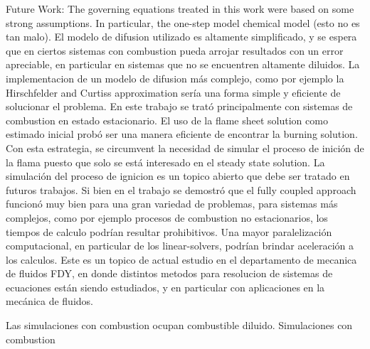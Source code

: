 Future Work:
The governing equations treated in this work were based on some strong assumptions. In particular, the one-step model chemical model (esto no es tan malo).
El modelo de difusion utilizado es altamente simplificado, y se espera que en ciertos sistemas con combustion pueda arrojar resultados con un error apreciable, en particular en sistemas que no se encuentren altamente diluidos. La implementacion de un modelo de difusion más complejo, como por ejemplo la Hirschfelder and Curtiss approximation sería una forma simple y eficiente de solucionar el problema. 
En este trabajo se trató principalmente con sistemas de combustion en estado estacionario. El uso de la flame sheet solution como estimado inicial probó ser una manera eficiente de encontrar la burning solution. Con esta estrategia, se circumvent la necesidad de simular el proceso de inición de la flama puesto  que solo se está interesado en el steady state solution.  La simulación del proceso de ignicion es un topico abierto que debe ser tratado en futuros trabajos. 
Si bien en el trabajo se demostró que el fully coupled approach funcionó muy bien para una gran variedad de problemas, para sistemas más complejos, como por ejemplo procesos de combustion no estacionarios, los tiempos de calculo podrían resultar prohibitivos. Una mayor paralelización computacional, en particular de los linear-solvers, podrían brindar aceleración a los calculos. Este es un topico de actual estudio en el departamento de mecanica de fluidos FDY, en donde distintos metodos para resolucion de sistemas de ecuaciones están siendo estudiados, y en particular con aplicaciones en la mecánica de fluidos. 

Las simulaciones con combustion ocupan combustible diluido. Simulaciones con combustion     